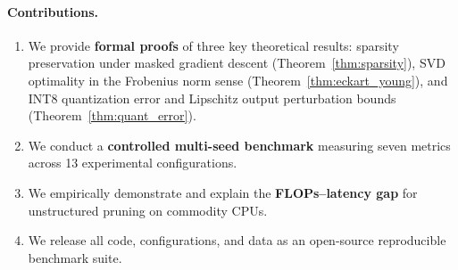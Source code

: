 \paragraph{Contributions.}
\begin{enumerate}[leftmargin=1.5em,topsep=2pt,itemsep=1pt]
  \item We provide \textbf{formal proofs} of three key theoretical results:
    sparsity preservation under masked gradient descent (Theorem~\ref{thm:sparsity}),
    SVD optimality in the Frobenius norm sense (Theorem~\ref{thm:eckart_young}),
    and INT8 quantization error and Lipschitz output perturbation bounds (Theorem~\ref{thm:quant_error}).
  \item We conduct a \textbf{controlled multi-seed benchmark} measuring
    seven metrics across 13 experimental configurations.
  \item We empirically demonstrate and explain the \textbf{FLOPs--latency gap}
    for unstructured pruning on commodity CPUs.
  \item We release all code, configurations, and data as an open-source
    reproducible benchmark suite.
\end{enumerate}
